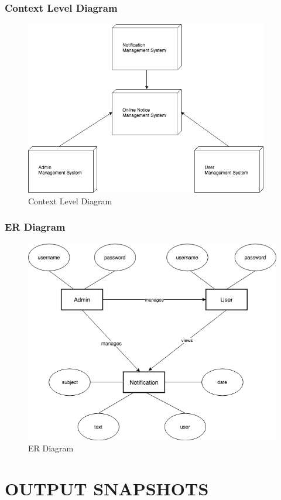 \documentclass[12pt,a4paper]{article}
\begin{document}
    	\subsubsection{Context Level Diagram}
    	\begin{figure}[H]
    		\centering
    		\includegraphics[height=3in]{figures/context_level.png}
    		\caption{Context Level Diagram}
    	\end{figure}
    	
    	\subsubsection{ER Diagram}
    	\begin{figure}[H]
    		\centering
    		\includegraphics[height=3.5in]{figures/erd.png}
    		\caption{ER Diagram}
    	\end{figure}
	
\newpage
\section{OUTPUT SNAPSHOTS}
    
\end{document}
